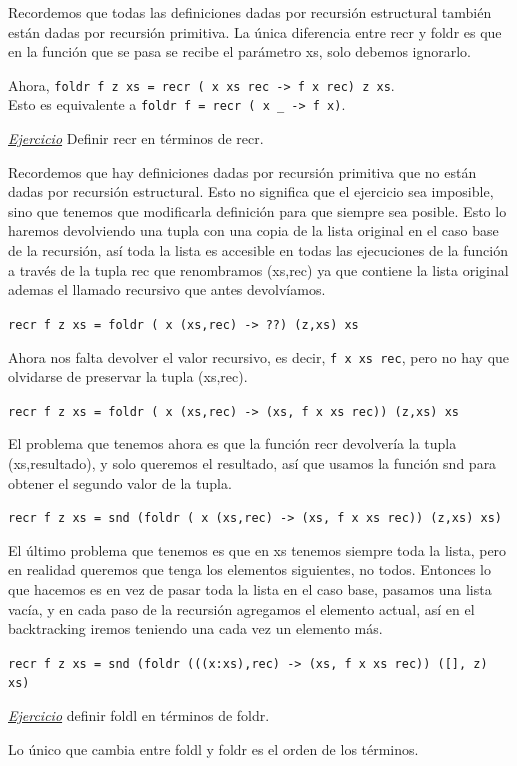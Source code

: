 \documentclass[12pt]{extarticle}
\def\ejercicio{\textit{\underline{Ejercicio} }}
\newcommand\hsline[1]{\texttt{#1}}
\begin{document}
Recordemos que todas las definiciones dadas por recursión estructural también están dadas por recursión primitiva. La única diferencia entre recr y foldr es que en la función que se pasa se recibe el parámetro xs, solo debemos ignorarlo.

Ahora, \hsline{foldr f z xs = recr (\ x xs rec -> f x rec) z xs}. \\
Esto es equivalente a \hsline{foldr f = recr (\ x _ -> f x)}.

\ejercicio Definir recr en términos de recr.

Recordemos que hay definiciones dadas por recursión primitiva que no están dadas por recursión estructural. Esto no significa que el ejercicio sea imposible, sino que tenemos que modificarla definición para que siempre sea posible. Esto lo haremos devolviendo una tupla con una copia de la lista original en el caso base de la recursión, así toda la lista es accesible en todas las ejecuciones de la función a través de la tupla rec que renombramos (xs,rec) ya que contiene la lista original ademas el llamado recursivo que antes devolvíamos.

\hsline{recr f z xs = foldr (\ x (xs,rec) -> ??) (z,xs) xs}

Ahora nos falta devolver el valor recursivo, es decir, \hsline{f x xs rec}, pero no hay que olvidarse de preservar la tupla (xs,rec).

\hsline{recr f z xs = foldr (\ x (xs,rec) -> (xs, f x xs rec)) (z,xs) xs}

El problema que tenemos ahora es que la función recr devolvería la tupla (xs,resultado), y solo queremos el resultado, así que usamos la función snd para obtener el segundo valor de la tupla.

\hsline{recr f z xs = snd (foldr (\ x (xs,rec) -> (xs, f x xs rec)) (z,xs) xs)}

El último problema que tenemos es que en xs tenemos siempre toda la lista, pero en realidad queremos que tenga los elementos siguientes, no todos. Entonces lo que hacemos es en vez de pasar toda la lista en el caso base, pasamos una lista vacía, y en cada paso de la recursión agregamos el elemento actual, así en el backtracking iremos teniendo una cada vez un elemento más.

\hsline{recr f z xs = snd (foldr (\x ((x:xs),rec) -> (xs, f x xs rec)) ([], z) xs)}

\ejercicio definir foldl en términos de foldr.

Lo único que cambia entre foldl y foldr es el orden de los términos.
\end{document}
